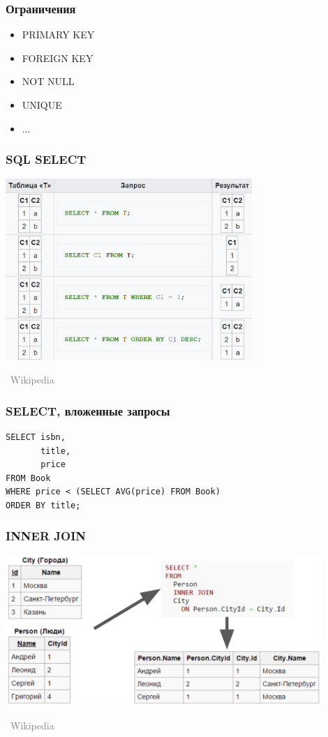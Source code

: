 \documentclass[xetex,mathserif,serif]{beamer}
\newcommand{\attribution}[1] {
\vspace{-5mm}\begin{flushright}\begin{scriptsize}\textcolor{gray}{\textcopyright\, #1}\end{scriptsize}\end{flushright}
}
\begin{document}
    \begin{frame}
        \frametitle{Ограничения}
        \begin{itemize}
            \item PRIMARY KEY
            \item FOREIGN KEY
            \item NOT NULL
            \item UNIQUE
            \item ...
        \end{itemize}
    \end{frame}

    \begin{frame}
        \frametitle{SQL SELECT}
        \begin{center}
            \includegraphics[width=0.7\textwidth]{select.png}
            \attribution{Wikipedia}
        \end{center}
    \end{frame}

    \begin{frame}[fragile]
        \frametitle{SELECT, вложенные запросы}
        \begin{verbatim}
SELECT isbn,
       title,
       price
FROM Book
WHERE price < (SELECT AVG(price) FROM Book)
ORDER BY title;
        \end{verbatim}
    \end{frame}

    \begin{frame}
        \frametitle{INNER JOIN}
        \begin{center}
            \includegraphics[width=0.9\textwidth]{innerJoin.png}
            \attribution{Wikipedia}
        \end{center}
    \end{frame}
\end{document}
